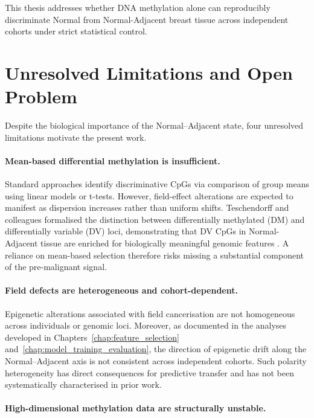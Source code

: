 This thesis addresses whether DNA methylation alone can
reproducibly discriminate Normal from Normal-Adjacent breast
tissue across independent cohorts under strict statistical control.

\section{Unresolved Limitations and Open Problem}

Despite the biological importance of the Normal--Adjacent state,
four unresolved limitations motivate the present work.

\paragraph{Mean-based differential methylation is insufficient.}

Standard approaches identify discriminative CpGs via
comparison of group means using linear models or t-tests.
However, field-effect alterations are expected to manifest
as dispersion increases rather than uniform shifts.
Teschendorff and colleagues formalised the distinction between
differentially methylated (DM) and differentially variable (DV)
loci, demonstrating that DV CpGs in Normal-Adjacent tissue are
enriched for biologically meaningful genomic features
\cite{Teschendorff2014,Teschendorff2016}.
A reliance on mean-based selection therefore risks missing
a substantial component of the pre-malignant signal.

\paragraph{Field defects are heterogeneous and cohort-dependent.}

Epigenetic alterations associated with field cancerisation
are not homogeneous across individuals or genomic loci.
Moreover, as documented in the analyses developed
in Chapters~\ref{chap:feature_selection}
and~\ref{chap:model_training_evaluation}, the direction
of epigenetic drift along the Normal--Adjacent axis
is not consistent across independent cohorts.
Such polarity heterogeneity has direct consequences for
predictive transfer and has not been systematically
characterised in prior work.

\paragraph{High-dimensional methylation data are structurally unstable.}

